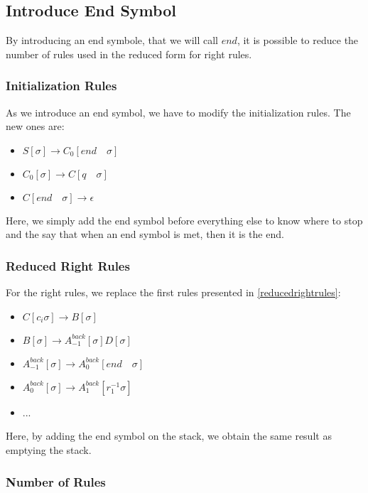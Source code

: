 \documentclass[10pt,a4paper,draft]{article}
\begin{document}
\subsection{Introduce End Symbol}

By introducing an end symbole, that we will call $end$, it is possible to reduce the number of rules used in the reduced form for right rules.

\subsubsection{Initialization Rules}

As we introduce an end symbol, we have to modify the initialization rules. The new ones are:

\begin{itemize}
\item $S[\sigma] \rightarrow C_0[end \quad \sigma]$
\item $C_0[\sigma] \rightarrow C[q \quad \sigma]$
\item $C[end \quad \sigma] \rightarrow \epsilon$
\end{itemize}

Here, we simply add the end symbol before everything else to know where to stop and the say that when an end symbol is met, then it is the end.

\subsubsection{Reduced Right Rules}

For the right rules, we replace the first rules presented in \ref{reducedrightrules}:

\begin{itemize}
\item $C[c_i \sigma] \rightarrow B[\sigma]$
\item $B[\sigma] \rightarrow A^{back}_{-1}[\sigma] D[\sigma]$
\item $A^{back}_{-1}[\sigma] \rightarrow A^{back}_{0}[end \quad \sigma]$
\item $A^{back}_{0}[\sigma] \rightarrow A^{back}_{1}[r_1^{-1} \sigma]$
\item ...
\end{itemize}

Here, by adding the end symbol on the stack, we obtain the same result as emptying the stack.

\subsubsection{Number of Rules}
\end{document}
